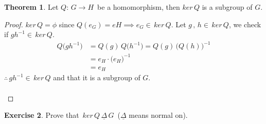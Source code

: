 \documentclass[11pt,a4paper]{article}
\theoremstyle{definition}
\newtheorem{thm}{Theorem}[subsection]
\newtheorem{exe}[thm]{Exercise}
\begin{document}
\begin{thm}
Let $Q :\, G\longrightarrow H\,$ be a homomorphism, then $ker\, Q$ is a subgroup of $G$.\\
\end{thm}

\begin{proof}
$ker\, Q = \phi$ since $Q(e_G) = eH \implies e_G\in \, ker\, Q$. Let $g\, , \, h\in \, ker\, Q$, we check if $gh^{-1}\in \, ker\, Q$. 
\begin{align*}
Q\big(gh^{-1}\big) & = Q(g)\, Q\big(h^{-1}\big) = Q(g)\, \big(Q(h)\big)^{-1}\\
& = e_H\cdot\big(e_H\big)^{-1}\\
& = e_H
\end{align*}
$\therefore\, gh^{-1}\in\, ker\, Q$ and that it is a subgroup of $G$.\\\\
\end{proof}






\begin{exe}
Prove that $\,ker\, Q\,\underline{\Delta}\, G\, $ ($\underline{\Delta}$ means normal on).\\
\end{exe}
\end{document}
